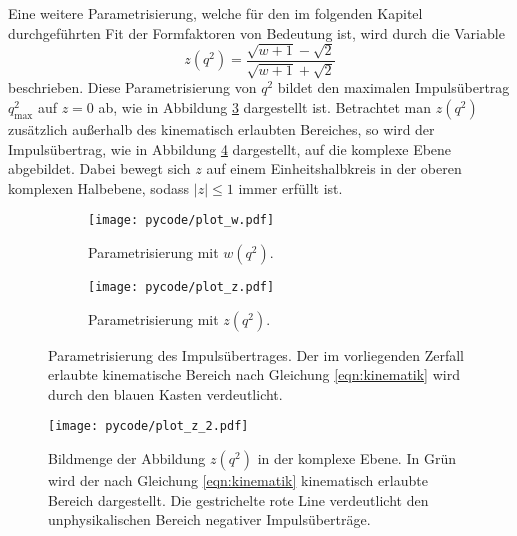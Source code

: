 Eine weitere Parametrisierung, welche für den im folgenden Kapitel durchgeführten Fit der Formfaktoren von Bedeutung ist, wird durch die Variable
\begin{equation}
  z(q^2) = \frac{\sqrt{w+1}-\sqrt{2}}{\sqrt{w+1}+\sqrt{2}}
\end{equation}
beschrieben.
Diese Parametrisierung von $q^2$ bildet den maximalen Impulsübertrag $q_\text{max}^2$ auf $z=0$ ab, wie in Abbildung \ref{fig:z_param} dargestellt ist.
Betrachtet man $z(q^2)$ zusätzlich außerhalb des kinematisch erlaubten Bereiches, so wird der Impulsübertrag, wie in Abbildung \ref{fig:z_kreis} dargestellt, auf die komplexe Ebene abgebildet.
Dabei bewegt sich $z$ auf einem Einheitshalbkreis in der oberen komplexen Halbebene, sodass $\lvert z \rvert \leq \num{1}$ immer erfüllt ist.

\begin{figure}
  \centering
  \begin{subfigure}{0.48\textwidth}
    \centering
    \texttt{[image: pycode/plot\_w.pdf]}
    \caption{Parametrisierung mit $w(q^2)$.}
    \label{fig:w_param}
  \end{subfigure}
  \begin{subfigure}{0.48\textwidth}
    \centering
    \texttt{[image: pycode/plot\_z.pdf]}
    \caption{Parametrisierung mit $z(q^2)$.}
    \label{fig:z_param}
  \end{subfigure}
  \caption{Parametrisierung des Impulsübertrages. Der im vorliegenden Zerfall erlaubte kinematische Bereich nach Gleichung \eqref{eqn:kinematik} wird durch den blauen Kasten verdeutlicht.}
\end{figure}

\begin{figure}
  \centering
  \texttt{[image: pycode/plot\_z\_2.pdf]}
  \caption{Bildmenge der Abbildung $z(q^2)$ in der komplexe Ebene. In Grün wird der nach Gleichung \eqref{eqn:kinematik} kinematisch erlaubte Bereich dargestellt. Die gestrichelte rote Line verdeutlicht den unphysikalischen Bereich negativer Impulsüberträge.}
  \label{fig:z_kreis}
\end{figure}
